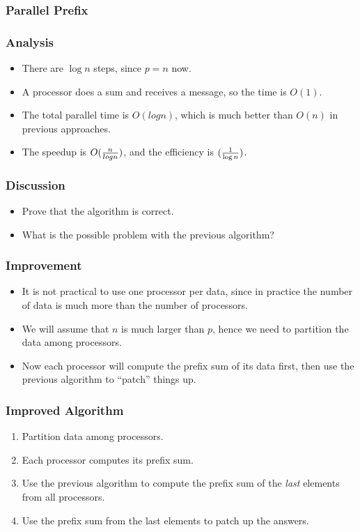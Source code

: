 \documentclass{beamer}
\begin{document}
\begin{CJK}{UTF8}{bsmi}
\begin{frame}
\frametitle{Parallel Prefix}
\centerline{}
\end{frame}

\begin{frame}
\frametitle{Analysis}
\begin{itemize}
\item There are $\log n$ steps, since $p = n$ now.
\item A processor does a sum and receives a message, so the time is
 $O(1)$.
\item The total parallel time is $O(log n)$, which is much better than
  $O(n)$ in previous approaches.
\item The speedup is $O({n \over log n})$, and the efficiency is $({1
  \over {\log n}})$.
\end{itemize}
\end{frame}

\begin{frame}
\frametitle{Discussion}
\begin{itemize}
\item Prove that the algorithm is correct.
\item What is the possible problem with the previous algorithm?
\end{itemize}
\end{frame}


\begin{frame}
\frametitle{Improvement}
\begin{itemize}
\item It is not practical to use one processor per data, since in
  practice the number of data is much more than the number of
  processors.
\item We will assume that $n$ is much larger than $p$, hence we need
  to partition the data among processors.
\item Now each processor will compute the prefix sum of its data
  first, then use the previous algorithm to ``patch'' things up.
\end{itemize}
\end{frame}

\begin{frame}
\frametitle{Improved Algorithm}
\begin{enumerate}
\item Partition data among processors.
\item Each processor computes its prefix sum.
\item Use the previous algorithm to compute the prefix sum of the {\em
  last} elements from all processors.
\item Use the prefix sum from the last elements to patch up the answers.
\end{enumerate}
\end{frame}


\end{CJK}
\end{document}
